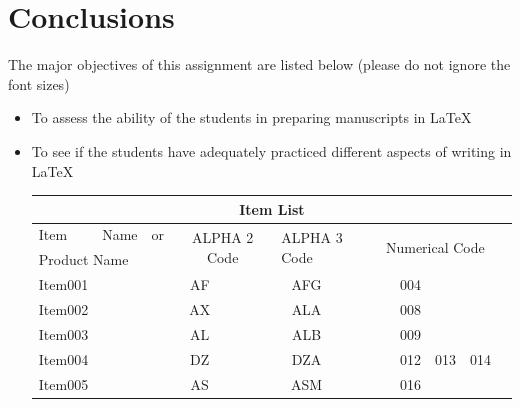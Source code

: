 \documentclass[14pt, a4paper]{article} %
\begin{document}
\section{Conclusions}
The major objectives of this assignment are listed below (please do not ignore the font sizes)
    \begin{itemize}
     \item {\huge{To assess the ability of the students in preparing manuscripts in \LaTeX}}
     \item {\large{To see if the students have adequately practiced different aspects of writing in \LaTeX}}
\begin{table}[b]
\begin{tabular}{|llc||ccc|cll|l|l|lll|}
\hline
\multicolumn{14}{|c|}{Item List}                                                                                                                                                                                \\ \hline
Item    & Name                 & or & \multicolumn{3}{c|}{\multirow{2}{*}{ALPHA 2 Code}} & \multicolumn{3}{l|}{\multirow{2}{*}{ALPHA 3 Code}} & \multicolumn{5}{l|}{\multirow{2}{*}{Numerical Code}}            \\
\multicolumn{3}{|l||}{Product Name}  & \multicolumn{3}{c|}{}                              & \multicolumn{3}{l|}{}                              & \multicolumn{5}{l|}{}                                           \\ \hline
Item001 & \multicolumn{1}{c}{} &    & AF               &                &                & AFG               &                &               &  & 004 &                          &                          &  \\ \cline{11-11}
Item002 &                      &    & AX               &                &                & ALA               &                &               &  & 008 &                          &                          &  \\ \cline{11-11}
Item003 & \multicolumn{1}{c}{} &    & AL               &                &                & ALB               &                &               &  & 009 &                          &                          &  \\ \cline{11-13}
Item004 &                      &    & DZ               &                &                & DZA               &                &               &  & 012 & \multicolumn{1}{l|}{013} & \multicolumn{1}{l|}{014} &  \\ \hline \hline
Item005 & \multicolumn{1}{c}{} &    & AS               &                &                & ASM               &                &               &  & 016 &                          &                          &  \\ \cline{11-12}

\end{tabular}
\end{table}
\end{itemize}
\end{document}
